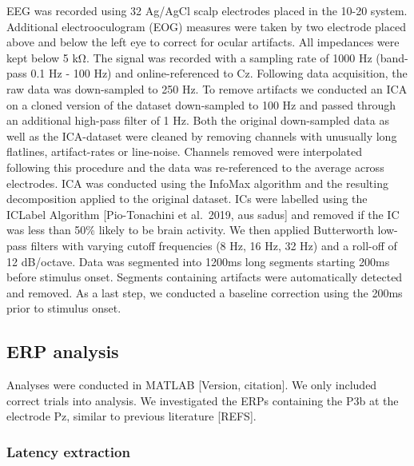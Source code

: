 \documentclass[
  man,floatsintext]{apa7}
\begin{document}
EEG was recorded using 32 Ag/AgCl scalp electrodes placed in the 10-20 system. Additional electrooculogram (EOG) measures were taken by two electrode placed above and below the left eye to correct for ocular artifacts. All impedances were kept below 5 kΩ. The signal was recorded with a sampling rate of 1000 Hz (band-pass 0.1 Hz - 100 Hz) and online-referenced to Cz. Following data acquisition, the raw data was down-sampled to 250 Hz. To remove artifacts we conducted an ICA on a cloned version of the dataset down-sampled to 100 Hz and passed through an additional high-pass filter of 1 Hz. Both the original down-sampled data as well as the ICA-dataset were cleaned by removing channels with unusually long flatlines, artifact-rates or line-noise. Channels removed were interpolated following this procedure and the data was re-referenced to the average across electrodes. ICA was conducted using the InfoMax algorithm and the resulting decomposition applied to the original dataset. ICs were labelled using the ICLabel Algorithm {[}Pio-Tonachini et al.~2019, aus sadus{]} and removed if the IC was less than 50\% likely to be brain activity. We then applied Butterworth low-pass filters with varying cutoff frequencies (8 Hz, 16 Hz, 32 Hz) and a roll-off of 12 dB/octave. Data was segmented into 1200ms long segments starting 200ms before stimulus onset. Segments containing artifacts were automatically detected and removed. As a last step, we conducted a baseline correction using the 200ms prior to stimulus onset.

\hypertarget{erp-analysis}{%
\subsection{ERP analysis}\label{erp-analysis}}

Analyses were conducted in MATLAB {[}Version, citation{]}. We only included correct trials into analysis. We investigated the ERPs containing the P3b at the electrode Pz, similar to previous literature {[}REFS{]}.

\hypertarget{latency-extraction}{%
\subsubsection{Latency extraction}\label{latency-extraction}}
\end{document}
